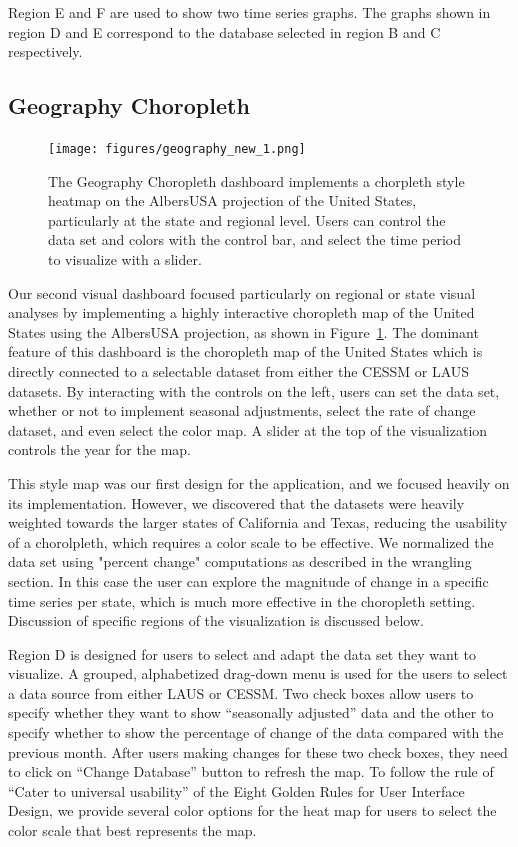 \documentclass{sigchi}
\begin{document}
Region E and F are used to show two time series graphs. The graphs shown in region D and E correspond to the  database selected in region B and C respectively.

\subsection{Geography Choropleth}

\begin{figure}[!ht]
    \centering
    \texttt{[image: figures/geography\_new\_1.png]}
    \caption{The Geography Choropleth dashboard implements a chorpleth style heatmap on the AlbersUSA projection of the United States, particularly at the state and regional level. Users can control the data set and colors with the control bar, and select the time period to visualize with a slider.}
    \label{fig:Geography}
\end{figure}

Our second visual dashboard focused particularly on regional or state visual analyses by implementing a highly interactive choropleth map of the United States using the AlbersUSA projection, as shown in Figure~\ref{fig:Geography}. The dominant feature of this dashboard is the choropleth map of the United States which is directly connected to a selectable dataset from either the CESSM or LAUS datasets. By interacting with the controls on the left, users can set the data set, whether or not to implement seasonal adjustments, select the rate of change dataset, and even select the color map. A slider at the top of the visualization controls the year for the map.

This style map was our first design for the application, and we focused heavily on its implementation. However, we discovered that the datasets were heavily weighted towards the larger states of California and Texas, reducing the usability of a chorolpleth, which requires a color scale to be effective. We normalized the data set using "percent change" computations as described in the wrangling section. In this case the user can explore the magnitude of change in a specific time series per state, which is much more effective in the choropleth setting. Discussion of specific regions of the visualization is discussed below.

Region D is designed for users to select and adapt the data set they want to visualize. A grouped, alphabetized drag-down menu is used for the users to select a data source from either LAUS or CESSM. Two check boxes allow users to specify whether they want to show ``seasonally adjusted'' data and the other to specify whether to show the percentage of change of the data compared with the previous month. After users making changes for these two check boxes, they need to click on ``Change Database'' button to refresh the map. To follow the rule of ``Cater to universal usability'' of the Eight Golden Rules for User Interface Design, we provide several color options for the heat map for users to select the color scale that best represents the map.
\end{document}
